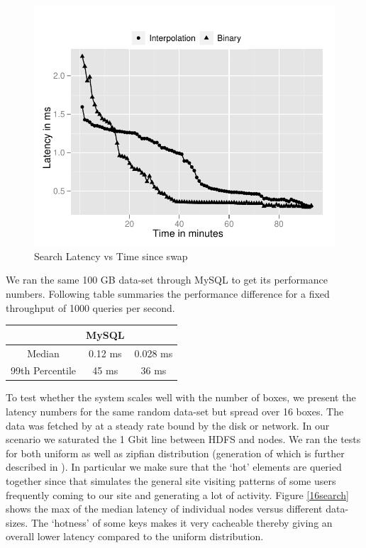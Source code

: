 \begin{figure}
  \centering
    \includegraphics[scale=0.55]{images/search_1node.pdf}
  \caption{Search Latency vs Time since swap}
  \label{search}
\end{figure}

We ran the same 100 GB data-set through MySQL to get its performance numbers. Following table summaries the performance difference for a fixed throughput of 1000 queries per second. 

\begin{center}
    \begin{tabular}{ | c | c | c |  }
    \hline
     & MySQL & \projectname{} \\ \hline
    Median &   0.12 ms &  0.028	ms \\
	99th Percentile	& 45 ms & 36 ms \\
\hline
    \end{tabular}
\end{center}

To test whether the system scales well with the number of boxes, we present the latency numbers for the same random data-set but spread over 16 boxes. The data was fetched by \projectname{} at a steady rate bound by the disk or network. In our scenario we saturated the 1 Gbit line between HDFS and \projectname{} nodes. We ran the tests for both uniform as well as zipfian distribution (generation of which is further described in \cite{gray}). In particular we make sure that the `hot' elements are queried together since that simulates the general site visiting patterns of some users frequently coming to our site and generating a lot of activity. Figure \ref{16search} shows the max of the median latency of individual nodes versus different data-sizes. The `hotness' of some keys makes it very cacheable thereby giving an overall lower latency compared to the uniform distribution. 

